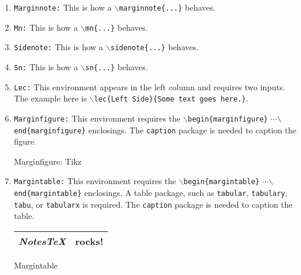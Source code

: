 \documentclass[10pt]{article}
\begin{document}
	\begin{enumerate}
		\item \texttt{Marginnote:} This is how a \texttt{$\backslash$marginnote\{...\}} behaves.
		\item \texttt{Mn:} This is how a \texttt{$\backslash$mn\{...\}} behaves.
		\item \texttt{Sidenote:} This is how a \texttt{$\backslash$sidenote\{...\}} behaves.
		\item \texttt{Sn:} This is how a \texttt{$\backslash$sn\{...\}} behaves.
		\item \texttt{Lec:} This environment appears in the left column and requires two inputs. The example here is \texttt{$\backslash$lec\{Left Side\}\{Some text goes here.\}}.
		\item \texttt{Marginfigure:} This environment requires the \texttt{$\backslash$begin\{marginfigure\}} {$\cdots$}\newline\texttt{$\backslash$end\{marginfigure\}} enclosings. The \texttt{caption} package is needed to caption the figure.
		\begin{marginfigure}
		\begin{center}
		\end{center}
		\caption{Marginfigure: Tikz}
		\end{marginfigure}%
		\item \texttt{Margintable:} This environment requires the \texttt{$\backslash$begin\{margintable\}} {$\cdots$}\newline\texttt{$\backslash$end\{margintable\}} enclosings. A table package, such as \texttt{tabular}, \texttt{tabulary}, \texttt{tabu}, or \texttt{tabularx} is required. The \texttt{caption} package is needed to caption the table.
		\begin{margintable}
			\vspace{.1in}
			\begin{tabularx}{\marginparwidth}{|X|X|}
			\hline
			\textit{NotesTeX} & \textbf{rocks!}\\
			\hline
			\end{tabularx}
			\caption{Margintable}
		\end{margintable}	\end{enumerate}
\end{document}
